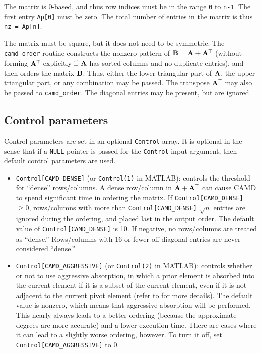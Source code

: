 \documentclass[11pt]{article}
\newcommand{\m}[1]{{\bf{#1}}}       %
\newcommand{\tr}{^{\sf T}}          %
\begin{document}
The matrix is 0-based, and thus
row indices must be in the range {\tt 0} to {\tt n-1}.
The first entry {\tt Ap[0]} must be zero.
The total number of entries in the matrix is thus {\tt nz = Ap[n]}.

The matrix must be square, but it does not need to be symmetric.
The {\tt camd\_order} routine constructs the nonzero pattern of
$\m{B} = \m{A}+\m{A}\tr$ (without forming $\m{A}\tr$ explicitly if
$\m{A}$ has sorted columns and no duplicate entries),
and then orders the matrix $\m{B}$.  Thus, either the
lower triangular part of $\m{A}$, the upper triangular part,
or any combination may be passed.  The transpose $\m{A}\tr$ may also be
passed to {\tt camd\_order}.
The diagonal entries may be present, but are ignored.

\subsection{Control parameters}
\label{control_param}

Control parameters are set in an optional {\tt Control} array.
It is optional in the sense that if
a {\tt NULL} pointer is passed for the {\tt Control} input argument,
then default control parameters are used.
%
\begin{itemize}
\item {\tt Control[CAMD\_DENSE]} (or {\tt Control(1)} in MATLAB):
controls the threshold for ``dense''
rows/columns.  A dense row/column in $\m{A}+\m{A}\tr$
can cause CAMD to spend significant time
in ordering the matrix.  If {\tt Control[CAMD\_DENSE]} $\ge 0$,
rows/columns with
more than {\tt Control[CAMD\_DENSE]} $\sqrt{n}$ entries are ignored during
the ordering, and placed last in the output order.  The default
value of {\tt Control[CAMD\_DENSE]} is 10.  If negative, no rows/columns
are treated as ``dense.''  Rows/columns with 16 or fewer off-diagonal
entries are never considered ``dense.''
%
\item {\tt Control[CAMD\_AGGRESSIVE]} (or {\tt Control(2)} in MATLAB):
controls whether or not to use
aggressive absorption, in which a prior element is absorbed into the current
element if it is a subset of the current element, even if it is not
adjacent to the current pivot element (refer
to \cite{AmestoyDavisDuff96,AmestoyDavisDuff04}
for more details).  The default value is nonzero,
which means that aggressive absorption will be performed.  This nearly always
leads to a better ordering (because the approximate degrees are more
accurate) and a lower execution time.  There are cases where it can
lead to a slightly worse ordering, however.  To turn it off, set
{\tt Control[CAMD\_AGGRESSIVE]} to 0.
%
\end{itemize}
\end{document}

